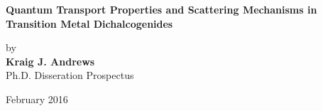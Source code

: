 \setcounter{page}{1}
\thispagestyle{empty}
\begin{titlepage}

	\begin{center}

	\singlespacing
	\textbf{Quantum Transport Properties and Scattering Mechanisms in Transition Metal Dichalcogenides}\\
	\doublespacing
	
	by\\
	
	\textbf{Kraig J. Andrews}\\
	Ph.D. Disseration Prospectus\\ 
	\vspace{1.0cm}

	February 2016\\
	\end{center}
	
	\begin{flushright}

   \vspace{1.0cm}
	 \\
   \vspace{0.7cm}
	\makebox[8.7cm][l]{$\overline {\hspace{7.8cm}}$} \\
   \vspace{0.9cm}
	\makebox[8.7cm][l]{$\overline {\hspace{7.8cm}}$} \\
   \vspace{0.9cm}
	\makebox[8.7cm][l]{$\overline {\hspace{7.8cm}}$} \\
	\end{flushright}
\end{titlepage}
